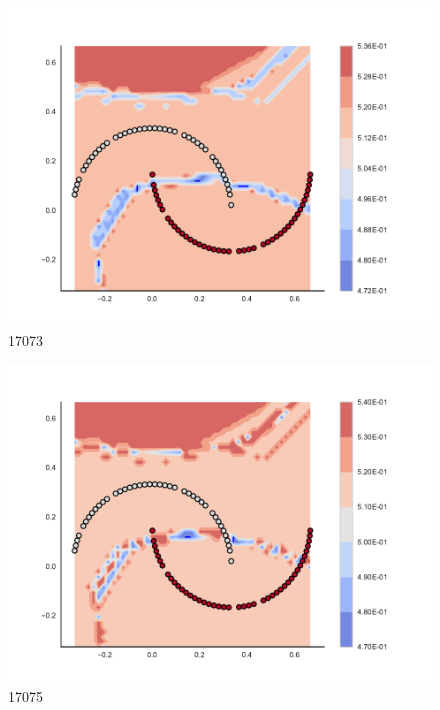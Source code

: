 \begin{subfigure}[b]{0.09\textwidth}
    \includegraphics[clip, trim=2.35cm 1.75cm 4.5cm 0cm,width=\textwidth]{img/convergence/17073.pdf}
    \caption{17073}
    \label{fig:convergence_17073}
\end{subfigure}
%
\begin{subfigure}[b]{0.09\textwidth}
    \includegraphics[clip, trim=2.35cm 1.75cm 4.5cm 0cm,width=\textwidth]{img/convergence/17075.pdf}
    \caption{17075}
    \label{fig:convergence_17075}
\end{subfigure}
%
